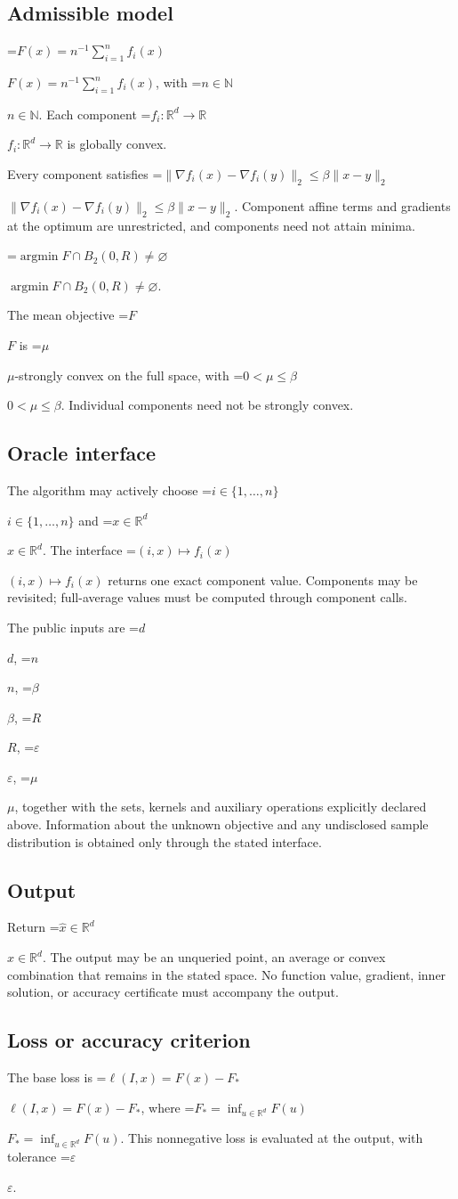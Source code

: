 \documentclass[10pt,a4paper]{article}
\newcommand{\AtlasMath}[1]{\par\begingroup\centering\setbox0=\hbox{$\displaystyle #1$}\ifdim\wd0>1.4\linewidth\typeout{ATLAS WIDE FORMULA: \the\wd0}\fi\ifdim\wd0>\linewidth\resizebox{\linewidth}{!}{\box0}\else\box0\fi\par\endgroup}
\newcommand{\AtlasInlineMath}[1]{\begingroup\setbox0=\hbox{$#1$}\ifdim\wd0>.4\linewidth\endgroup\AtlasMath{#1}\else\endgroup$#1$\fi}
\begin{document}
\subsection{Admissible model}
\AtlasInlineMath{F(x)=n^{-1}\sum_{i=1}^n f_i(x)}, with \AtlasInlineMath{n\in\mathbb{N}}. Each component \AtlasInlineMath{f_i:\mathbb{R}^d\to\mathbb{R}} is globally convex.

Every component satisfies \AtlasInlineMath{\|\nabla f_i(x)-\nabla f_i(y)\|_2\le\beta\|x-y\|_2}. Component affine terms and gradients at the optimum are unrestricted, and components need not attain minima.

\AtlasInlineMath{\operatorname{argmin}F\cap B_2(0,R)\ne\varnothing}.

The mean objective \AtlasInlineMath{F} is \AtlasInlineMath{\mu}-strongly convex on the full space, with \AtlasInlineMath{0<\mu\le\beta}. Individual components need not be strongly convex.

\subsection{Oracle interface}
The algorithm may actively choose \AtlasInlineMath{i\in\{1,\ldots,n\}} and \AtlasInlineMath{x\in\mathbb{R}^d}. The interface \AtlasInlineMath{(i,x)\mapsto f_i(x)} returns one exact component value. Components may be revisited; full-average values must be computed through component calls.

The public inputs are \AtlasInlineMath{d}, \AtlasInlineMath{n}, \AtlasInlineMath{\beta}, \AtlasInlineMath{R}, \AtlasInlineMath{\varepsilon}, \AtlasInlineMath{\mu}, together with the sets, kernels and auxiliary operations explicitly declared above. Information about the unknown objective and any undisclosed sample distribution is obtained only through the stated interface.

\subsection{Output}
Return \AtlasInlineMath{\widehat{x}\in \mathbb{R}^d}. The output may be an unqueried point, an average or convex combination that remains in the stated space. No function value, gradient, inner solution, or accuracy certificate must accompany the output.

\subsection{Loss or accuracy criterion}
The base loss is \AtlasInlineMath{\ell(I,x)=F(x)-F_*}, where \AtlasInlineMath{F_*=\inf_{u\in \mathbb{R}^d}F(u)}. This nonnegative loss is evaluated at the output, with tolerance \AtlasInlineMath{\varepsilon}.
\end{document}
